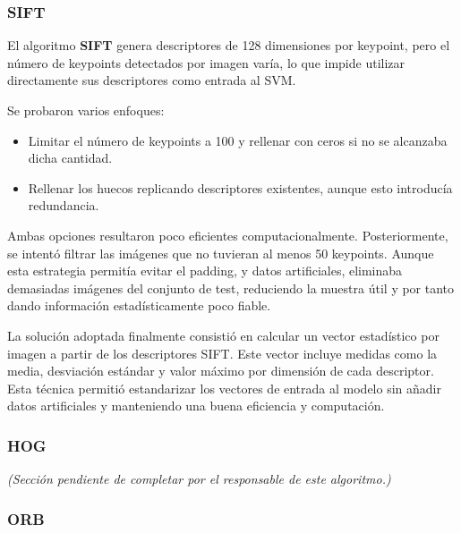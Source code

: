 \documentclass[a4paper]{article}
\begin{document}
\subsubsection*{SIFT}

El algoritmo \textbf{SIFT} genera descriptores de 128 dimensiones por keypoint, pero el número de keypoints detectados por imagen varía, lo que impide utilizar directamente sus descriptores como entrada al SVM.
\par\vspace{0.5cm}

Se probaron varios enfoques:
\par\vspace{0.5cm}

\begin{itemize}
    \item Limitar el número de keypoints a 100 y rellenar con ceros si no se alcanzaba dicha cantidad.
    \item Rellenar los huecos replicando descriptores existentes, aunque esto introducía redundancia.
\end{itemize}

Ambas opciones resultaron poco eficientes computacionalmente. Posteriormente, se intentó filtrar las imágenes que no tuvieran al menos 50 keypoints. Aunque esta estrategia permitía evitar el padding, y datos artificiales, eliminaba demasiadas imágenes del conjunto de test, reduciendo la muestra útil y por tanto dando información estadísticamente poco fiable.
\par\vspace{0.5cm}

La solución adoptada finalmente consistió en calcular un vector estadístico por imagen a partir de los descriptores SIFT. Este vector incluye medidas como la media, desviación estándar y valor máximo por dimensión de cada descriptor. Esta técnica permitió estandarizar los vectores de entrada al modelo sin añadir datos artificiales y manteniendo una buena eficiencia y computación.


\subsubsection*{HOG}

\textit{(Sección pendiente de completar por el responsable de este algoritmo.)}



\subsubsection*{ORB}
\end{document}
